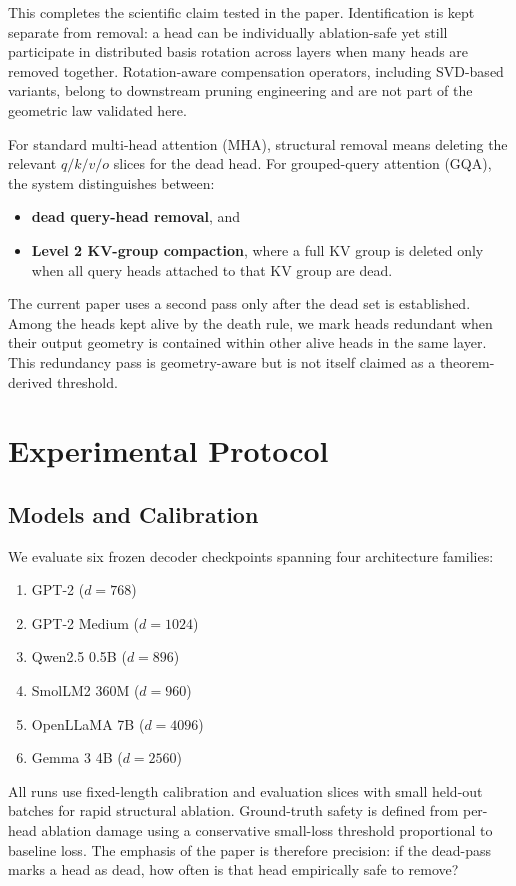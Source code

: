 \documentclass[aps,prd,onecolumn,superscriptaddress,showpacs,12pt]{revtex4-2}
\begin{document}
This completes the scientific claim tested in the paper. Identification is kept
separate from removal: a head can be individually ablation-safe yet still
participate in distributed basis rotation across layers when many heads are
removed together. Rotation-aware compensation operators, including SVD-based
variants, belong to downstream pruning engineering and are not part of the
geometric law validated here.

For standard multi-head attention (MHA), structural removal means deleting the
relevant $q/k/v/o$ slices for the dead head. For grouped-query attention (GQA), the
system distinguishes between:
\begin{itemize}
\item \textbf{dead query-head removal}, and
\item \textbf{Level 2 KV-group compaction}, where a full KV group is deleted only
when all query heads attached to that KV group are dead.
\end{itemize}

The current paper uses a second pass only after the dead set is established.
Among the heads kept alive by the death rule, we mark heads redundant when their
output geometry is contained within other alive heads in the same layer. This
redundancy pass is geometry-aware but is not itself claimed as a theorem-derived
threshold.

\section{Experimental Protocol}

\subsection{Models and Calibration}

We evaluate six frozen decoder checkpoints spanning four architecture families:
\begin{enumerate}
\item GPT-2 ($d=768$)
\item GPT-2 Medium ($d=1024$)
\item Qwen2.5 0.5B ($d=896$)
\item SmolLM2 360M ($d=960$)
\item OpenLLaMA 7B ($d=4096$)
\item Gemma 3 4B ($d=2560$)
\end{enumerate}

All runs use fixed-length calibration and evaluation slices with small held-out
batches for rapid structural ablation. Ground-truth safety is defined from per-head
ablation damage using a conservative small-loss threshold proportional to baseline
loss. The emphasis of the paper is therefore precision: if the dead-pass marks a
head as dead, how often is that head empirically safe to remove?
\end{document}
